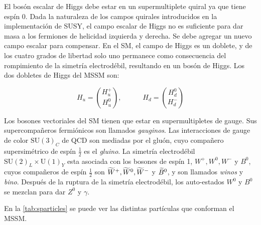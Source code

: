 El bosón escalar de Higgs debe estar en un supermultiplete quiral ya que tiene
espín 0. Dada la naturaleza de los campos quirales introducidos en la
implementación de SUSY, el campo escalar de Higgs no es suficiente para dar masa
a los fermiones de helicidad izquierda y derecha. Se debe agregar un nuevo campo
escalar para compensar. En el SM, el campo de Higgs es un doblete, y de los
cuatro grados de libertad solo uno permanece como consecuencia del rompimiento
de la simetría electrodébil, resultando en un bosón de Higgs. Los dos dobletes
de Higgs del MSSM son:

\begin{equation}
  H_u = \binom{H_u^+}{H_u^0}, \quad \quad \quad H_d = \binom{H_d^0}{H_d^-}
\end{equation}

Los bosones vectoriales del SM tienen que estar en supermultipletes de gauge.
Sus supercompañeros fermiónicos son llamados \emph{gauginos}. Las interacciones
de gauge de color $\text{SU}(3)_C$ de QCD son mediadas por el gluón, cuyo
compañero supersimétrico de espín $\frac{1}{2}$ es el \emph{gluino}. La simetría
electrodébil $\text{SU}(2)_L \times \text{U}(1)_Y$ esta asociada con los bosones
de espín 1, $W^+, W^0, W^-$ y $B^0$, cuyos compañeros de espín $\frac{1}{2}$ son $\widetilde{W}^+,
\widetilde{W}^0, \widetilde{W}^-$ y $\widetilde{B}^0$, y son llamados \emph{winos} y
\emph{bino}. Después de la ruptura de la simetría electrodébil, los auto-estados
$W^0$ y $B^0$ se mezclan para dar $Z^0$ y $\gamma$.

En la \cref{tab:sparticles} se puede ver las distintas partículas que
conforman el MSSM.


